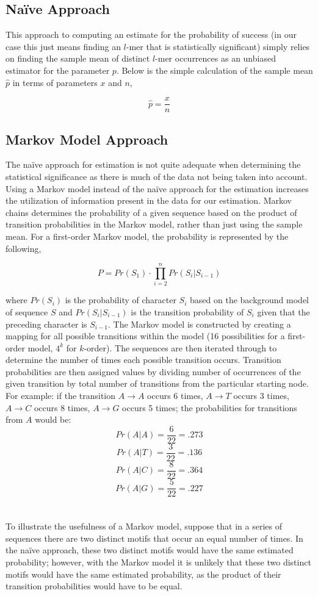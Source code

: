 \documentclass[12pt]{article}
\begin{document}
\subsection{Na\"{i}ve Approach}
This approach to computing an estimate for the probability of success (in our case this just means finding
an $l$-mer that is statistically significant) simply relies on finding the sample mean of distinct $l$-mer
occurrences as an unbiased estimator for the parameter $p$. Below is the simple calculation of the sample 
mean $\hat{p}$ in terms of parameters $x$ and $n$,

$$ \hat{p} = \frac{x}{n} $$


\subsection{Markov Model Approach}
The na\"{i}ve approach for estimation is not quite adequate when determining the statistical significance 
as there is much of the data not being taken into account. Using a Markov model instead of the na\"{i}ve 
approach for the estimation increases the utilization of information present in the data for our estimation.
Markov chains determines the probability of a given sequence based on the product of transition probabilities 
in the Markov model, rather than just using the sample mean. For a first-order Markov model, the probability
is represented by the following,

$$ P = Pr(S_1)\cdot\prod_{i = 2}^{n} Pr(S_i|S_{i-1}) $$

\noindent where $Pr(S_i)$ is the probability of character $S_i$ based on the background model of sequence $S$ 
and $Pr(S_i|S_{i-1})$ is the transition probability of $S_i$ given that the preceding character is $S_{i-1}$.
The Markov model is constructed by creating a mapping for all possible transitions within the model (16
possibilities for a first-order model, $4^k$ for $k$-order). The sequences are then iterated through to
determine the number of times each possible transition occurs. Transition probabilities are then assigned
values by dividing number of occurrences of the given transition by total number of transitions from the
particular starting node. For example: if the transition $A \rightarrow A$ occurs 6 times, 
$A \rightarrow T$ occurs 3 times,
$A \rightarrow C$ occurs 8 times,
$A \rightarrow G$ occurs 5 times; the probabilities for transitions from $A$ would be:
$$Pr(A|A) = \frac{6}{22} = .273$$
$$Pr(A|T) = \frac{3}{22} = .136$$
$$Pr(A|C) = \frac{8}{22} = .364$$
$$Pr(A|G) = \frac{5}{22} = .227$$
\\
\\
To illustrate the usefulness of a Markov model, suppose that in a series of sequences there are two distinct 
motifs that occur an equal number of times. In the na\"{i}ve approach, these two distinct motifs would have 
the same estimated probability; however, with the Markov model it is unlikely that these two distinct 
motifs would have the same estimated probability, as the product of their transition probabilities would 
have to be equal.
\end{document}
